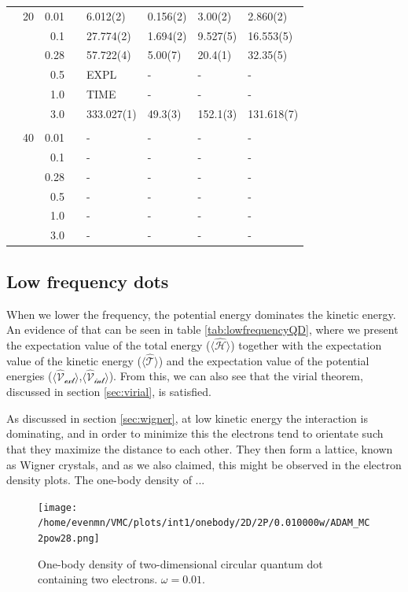 \begin{table}
\begin{tabularx}{\textwidth}{R{1.5cm}rrcR{2.3cm}R{2.3cm}R{2.3cm}R{2.3cm}}
		&20 & 0.01 && 6.012(2) & 0.156(2) & 3.00(2) & 2.860(2) \\
		&& 0.1 && 27.774(2) & 1.694(2) & 9.527(5) & 16.553(5) \\
		&& 0.28 && 57.722(4) & 5.00(7) & 20.4(1) & 32.35(5) \\
		&& 0.5 && EXPL & - & - & - \\
		&& 1.0 && TIME & - & - & - \\
		&& 3.0 && 333.027(1) & 49.3(3) & 152.1(3) & 131.618(7) \\ \hdashline \\
		
		&40 & 0.01 && - & - & - & - \\
		&& 0.1 && - & - & - & - \\
		&& 0.28 && - & - & - & - \\
		&& 0.5 && - & - & - & - \\
		&& 1.0 && - & - & - & - \\
		&& 3.0 && - & - & - & - \\ \hline \hline
	\end{tabularx}
\end{table}

\subsection{Low frequency dots}
When we lower the frequency, the potential energy dominates the kinetic energy. An evidence of that can be seen in table \eqref{tab:lowfrequencyQD}, where we present the expectation value of the total energy ($\langle \hat{\mathcal{H}}\rangle$) together with the expectation value of the kinetic energy ($\langle \hat{\mathcal{T}}\rangle$) and the expectation value of the potential energies ($\langle \mathcal{\hat{V}_{\text{ext}}} \rangle$,$\langle \mathcal{\hat{V}_{\text{int}}} \rangle$). From this, we can also see that the virial theorem, discussed in section \ref{sec:virial}, is satisfied.

As discussed in section \ref{sec:wigner}, at low kinetic energy the interaction is dominating, and in order to minimize this the electrons tend to orientate such that they maximize the distance to each other. They then form a lattice, known as Wigner crystals, and as we also claimed, this might be observed in the electron density plots. The one-body density of ...

\begin{figure}[H]
	\centering
	\texttt{[image: /home/evenmn/VMC/plots/int1/onebody/2D/2P/0.010000w/ADAM\_MC2pow28.png]}
	\caption{One-body density of two-dimensional circular quantum dot containing two electrons. $\omega=0.01$.}
\end{figure}

